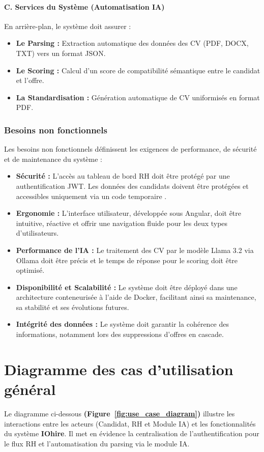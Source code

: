 \documentclass[12pt,a4paper,oneside]{report}
\begin{document}
\begin{itemize}
\paragraph{C. Services du Système (Automatisation IA)}
En arrière-plan, le système doit assurer :
\begin{itemize}
    \item \textbf{Le Parsing :} Extraction automatique des données des CV (PDF, DOCX, TXT) vers un format JSON.
    \item \textbf{Le Scoring :} Calcul d'un score de compatibilité sémantique entre le candidat et l'offre.
    \item \textbf{La Standardisation :} Génération automatique de CV uniformisés en format PDF.
\end{itemize}

\subsubsection{Besoins non fonctionnels}

Les besoins non fonctionnels définissent les exigences de performance, de sécurité et de maintenance du système :

\begin{itemize}
    \item \textbf{Sécurité :} L'accès au tableau de bord RH doit être protégé par une authentification JWT. Les données des candidats doivent être protégées et accessibles uniquement via un code temporaire .
    \item \textbf{Ergonomie :} L'interface utilisateur, développée sous Angular, doit être intuitive, réactive et offrir une navigation fluide pour les deux types d'utilisateurs.
    \item \textbf{Performance de l'IA :} Le traitement des CV par le modèle Llama 3.2 via Ollama doit être précis et le temps de réponse pour le scoring doit être optimisé.
    \item \textbf{Disponibilité et Scalabilité :} Le système doit être déployé dans une architecture conteneurisée à l'aide de Docker, facilitant ainsi sa maintenance, sa stabilité et ses évolutions futures.
    \item \textbf{Intégrité des données :} Le système doit garantir la cohérence des informations, notamment lors des suppressions d'offres en cascade.
\end{itemize}

\section{Diagramme des cas d’utilisation général}
Le diagramme ci-dessous \textbf{(Figure~\ref{fig:use_case_diagram})} illustre les interactions entre les acteurs (Candidat, RH et Module IA) et les fonctionnalités du système \textbf{IOhire}. Il met en évidence la centralisation de l'authentification pour le flux RH et l'automatisation du parsing via le module IA.


\end{itemize}
\end{document}
